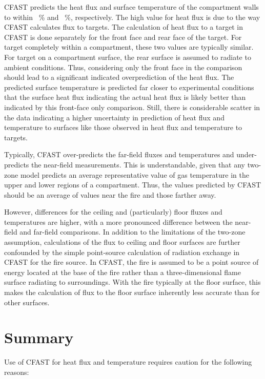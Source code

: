 CFAST predicts the heat flux and surface temperature of the compartment walls to within \Surfacefluxavg ~\% and \Surfacetempavg ~\%, respectively.  The high value for heat flux is due to the way CFAST calculates flux to targets.  The calculation of heat flux to a target in CFAST is done separately for the front face and rear face of the target.  For target completely within a compartment, these two values are typically similar.  For target on a compartment surface, the rear surface is assumed to radiate to ambient conditions.  Thus, considering only the front face in the comparison should lead to a significant indicated overprediction of the heat flux. The predicted surface temperature is predicted far closer to experimental conditions that the surface heat flux indicating the actual heat flux is likely better than indicated by this front-face only comparison. Still, there is considerable scatter in the data indicating a higher uncertainty in prediction of heat flux and temperature to surfaces like those observed in heat flux and temperature to targets.

Typically, CFAST over-predicts the far-field fluxes and temperatures and under-predicts the near-field measurements.  This is understandable, given that any two-zone model predicts an average representative value of gas temperature in the upper and lower regions of a compartment.  Thus, the values predicted by CFAST should be an average of values near the fire and those farther away.

However, differences for the ceiling and (particularly) floor fluxes and temperatures are higher, with a more pronounced difference between the near-field and far-field comparisons.  In addition to the limitations of the two-zone assumption, calculations of the flux to ceiling and floor surfaces are further confounded by the simple point-source calculation of radiation exchange in CFAST for the fire source.  In CFAST, the fire is assumed to be a point source of energy located at the base of the fire rather than a three-dimensional flame surface radiating to surroundings.  With the fire typically at the floor surface, this makes the calculation of flux to the floor surface inherently less accurate than for other surfaces.

\section{Summary}

Use of CFAST for heat flux and temperature requires caution for the following reasons:


